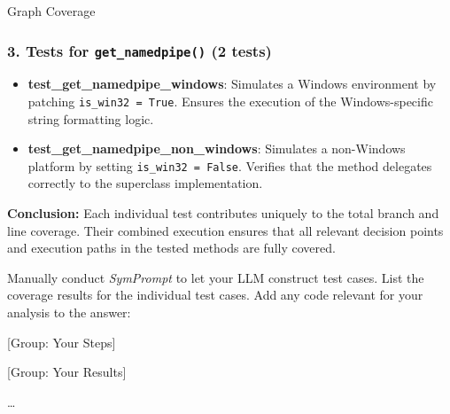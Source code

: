 \documentclass[a4paper]{scrreprt}
\newcounter{question}
\begin{document}
\begin{question}{Graph Coverage}
\begin{enumerate}[topsep=0pt, leftmargin=*]
\begin{answer}
\subsubsection*{3. Tests for \texttt{get\_namedpipe()} (2 tests)}

\begin{itemize}
    \item \textbf{test\_get\_namedpipe\_windows}: Simulates a Windows environment by patching \texttt{is\_win32 = True}. Ensures the execution of the Windows-specific string formatting logic.

    \item \textbf{test\_get\_namedpipe\_non\_windows}: Simulates a non-Windows platform by setting \texttt{is\_win32 = False}. Verifies that the method delegates correctly to the superclass implementation.
\end{itemize}

\textbf{Conclusion:} Each individual test contributes uniquely to the total branch and line coverage. Their combined execution ensures that all relevant decision points and execution paths in the tested methods are fully covered.







          \end{answer}
  \end{enumerate}
\end{question}

\begin{aiTask}
  Manually conduct \textit{SymPrompt} to let your LLM construct test cases. List the coverage results for the individual test cases. Add any code relevant for your analysis to the answer:
  \begin{answer}

    [Group: Your Steps]

    [Group: Your Results]

    \dots
  \end{answer}
\end{aiTask}
\end{document}
